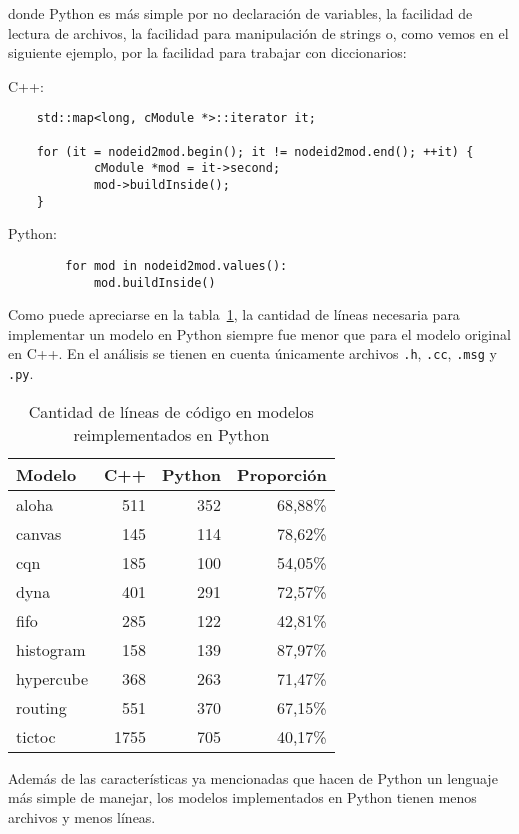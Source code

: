 donde Python es más simple por no declaración de variables, la facilidad de
lectura de archivos, la facilidad para manipulación de strings o, como vemos en
el siguiente ejemplo, por la facilidad para trabajar con diccionarios:

C++:

\begin{verbatim}
    std::map<long, cModule *>::iterator it;

    for (it = nodeid2mod.begin(); it != nodeid2mod.end(); ++it) {
            cModule *mod = it->second;
            mod->buildInside();
    }
\end{verbatim}

Python:

\begin{verbatim}
        for mod in nodeid2mod.values():
            mod.buildInside()
\end{verbatim}

Como puede apreciarse en la tabla~\ref{table:loc}, la cantidad de líneas
necesaria para implementar un modelo en Python siempre fue menor que para el
modelo original en C++.  En el análisis se tienen en cuenta únicamente archivos
\verb!.h!, \verb!.cc!, \verb!.msg! y \verb!.py!.

\begin{table}[h!]
\centering
\begin{tabular}{l|rrr}
Modelo & C++ & Python & Proporción\\
\hline

aloha     & 511  & 352  & 68,88\% \\
canvas    & 145  & 114  & 78,62\% \\
cqn       & 185  & 100  & 54,05\% \\
dyna      & 401  & 291  & 72,57\% \\
fifo      & 285  & 122  & 42,81\% \\
histogram & 158  & 139  & 87,97\% \\
hypercube & 368  & 263  & 71,47\% \\
routing   & 551  & 370  & 67,15\% \\
tictoc    & 1755 & 705  & 40,17\% \\
\end{tabular}
\caption{Cantidad de líneas de código en modelos reimplementados en Python}
\label{table:loc}
\end{table}

Además de las características ya mencionadas que hacen de Python un lenguaje
más simple de manejar, los modelos implementados en Python tienen menos
archivos y menos líneas.
